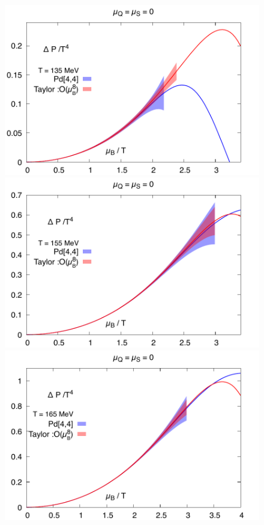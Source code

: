 \documentclass[pdflatex,prd,twocolumn,showpacs,superscriptaddress,nofootinbib]{revtex4-1}
\begin{document}
\begin{figure}[ht]
\includegraphics[scale=0.35]{fig/Pade_pressure_T135.pdf}
\includegraphics[scale=0.35]{fig/Pade_pressure_T155.pdf}
\includegraphics[scale=0.35]{fig/Pade_pressure_T165.pdf}

\end{figure}
\end{document}

